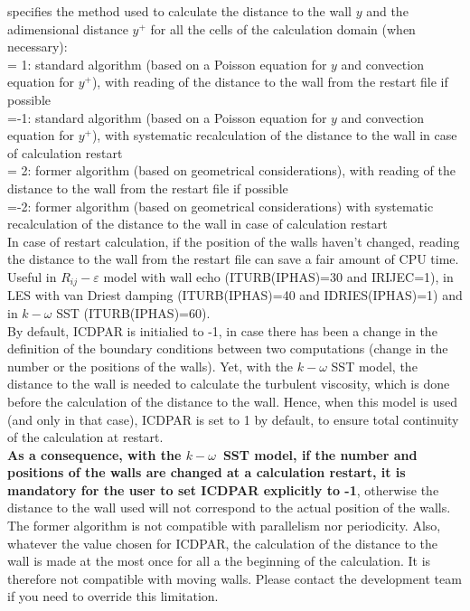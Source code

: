 {specifies the method used to calculate the distance to the wall $y$ and the
adimensional distance $y^+$ for all the
cells of the calculation domain (when necessary):\\
\hspace*{1.3cm}= 1: standard algorithm (based on a Poisson equation for $y$ and
convection equation for $y^+$),
with reading of the distance to the wall from the restart file
if possible\\
\hspace*{1.3cm}=-1: standard algorithm (based on a Poisson equation for $y$ and
convection equation for $y^+$),
with systematic recalculation of the distance to the wall in case of
calculation restart\\
\hspace*{1.3cm}= 2: former algorithm (based on geometrical
considerations),
with reading of the distance to the wall from the restart file
if possible\\
\hspace*{1.3cm}=-2: former algorithm (based on geometrical
considerations) with systematic recalculation of the distance to the
wall in case of calculation restart\\
In case of restart calculation, if the position of the walls haven't changed,
reading the distance to the wall from the restart file can save a fair amount of
CPU time.\\
Useful in $R_{ij}-\varepsilon$ model with wall echo (ITURB(IPHAS)=30 and IRIJEC=1),
in LES with van Driest damping (ITURB(IPHAS)=40 and IDRIES(IPHAS)=1) and
in $k-\omega$ SST (ITURB(IPHAS)=60). \\
By default, ICDPAR is initialied to -1, in case there has been a change in the
definition of the boundary conditions between two computations (change in the
number or the positions of the walls). Yet, with the $k-\omega$ SST model, the
distance to the wall is needed to calculate the turbulent viscosity, which is
done before the calculation of the distance to the wall. Hence, when this model
is used (and only in that case), ICDPAR is set to 1 by default, to ensure total
continuity of the calculation at restart.\\
{\bf As a consequence, with the \boldmath$k-\omega$\unboldmath\ SST model, if
the number and positions of the walls are changed at a calculation restart, it
is mandatory for the user to set ICDPAR explicitly to -1}, otherwise the
distance to the wall used will not correspond to the actual position of the
walls.\\
The former algorithm is not compatible with parallelism nor periodicity. Also,
whatever the value chosen for ICDPAR, the calculation of the distance to the
wall is made at the most once for all a the beginning of the calculation. It is
therefore not compatible with moving walls. Please contact the development team
if you need to override this limitation.}


